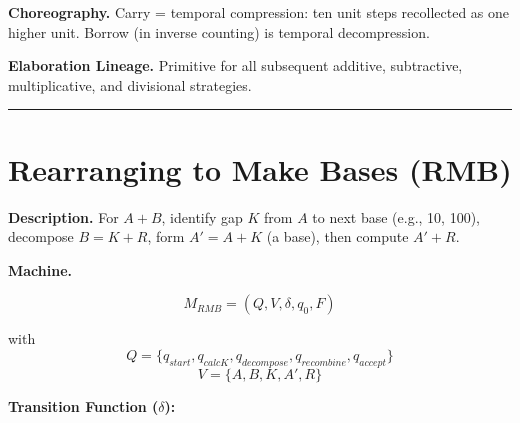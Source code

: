 \documentclass[
]{article}
\begin{document}
\textbf{Choreography.} Carry = temporal compression: ten unit steps
recollected as one higher unit. Borrow (in inverse counting) is temporal
decompression.

\textbf{Elaboration Lineage.} Primitive for all subsequent additive,
subtractive, multiplicative, and divisional strategies.

\begin{center}\rule{0.5\linewidth}{0.5pt}\end{center}

\section{Rearranging to Make Bases
(RMB)}\label{rearranging-to-make-bases-rmb}

\textbf{Description.} For \(A + B\), identify gap \(K\) from \(A\) to
next base (e.g., 10, 100), decompose \(B = K + R\), form \(A' = A + K\)
(a base), then compute \(A' + R\).

\textbf{Machine.}

\[M_{RMB} = (Q, V, \delta, q_0, F)\]

with
\[Q = \{q_{start}, q_{calcK}, q_{decompose}, q_{recombine}, q_{accept}\}\]
\[V = \{A, B, K, A', R\}\]

\textbf{Transition Function (\(\delta\)):}
\end{document}

